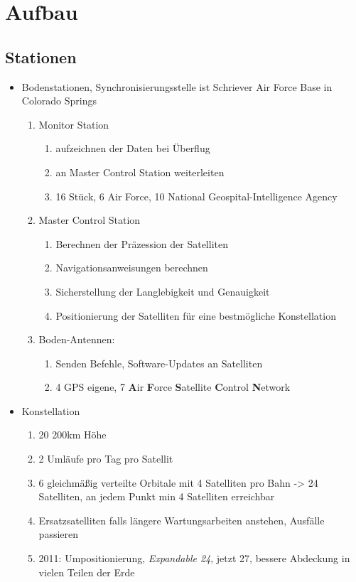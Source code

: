 \section{Aufbau}
\label{sec:aufbau}

\subsection{Stationen}
\begin{itemize}
    \item Bodenstationen, Synchronisierungsstelle ist Schriever Air Force Base in Colorado Springs
    \begin{enumerate}
        \item Monitor Station
        \begin{enumerate}
            \item aufzeichnen der Daten bei Überflug
            \item an Master Control Station weiterleiten
            \item 16 Stück, 6 Air Force, 10 National Geospital-Intelligence Agency
        \end{enumerate}
        \item Master Control Station
        \begin{enumerate}
            \item Berechnen der Präzession der Satelliten
            \item Navigationsanweisungen berechnen
            \item Sicherstellung der Langlebigkeit und Genauigkeit
            \item Positionierung der Satelliten für eine bestmögliche Konstellation
        \end{enumerate}
        \item Boden-Antennen:
        \begin{enumerate}
            \item Senden Befehle, Software-Updates an Satelliten
            \item 4 GPS eigene, 7 \textbf{A}ir \textbf{F}orce \textbf{S}atellite \textbf{C}ontrol \textbf{N}etwork
        \end{enumerate}
    \end{enumerate}
    \item Konstellation
    \begin{enumerate}
        \item 20 200km Höhe
        \item 2 Umläufe pro Tag pro Satellit
        \item 6 gleichmäßig verteilte Orbitale mit 4 Satelliten pro Bahn -> 24 Satelliten, an jedem Punkt min 4 Satelliten erreichbar
        \item Ersatzsatelliten falls längere Wartungsarbeiten anstehen, Ausfälle passieren
        \item 2011: Umpositionierung, \textit{Expandable 24}, jetzt 27, bessere Abdeckung in vielen Teilen der Erde
    \end{enumerate}
\end{itemize}

